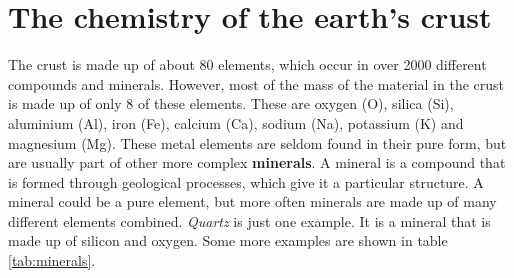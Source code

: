 
% 






\section{The chemistry of the earth's crust}

The crust is made up of about 80 elements, which occur in over 2000 different compounds and minerals. However, most of the mass of the material in the crust is made up of only 8 of these elements. These are oxygen (O), silica (Si), aluminium (Al), iron (Fe), calcium (Ca), sodium (Na), potassium (K) and magnesium (Mg). These metal elements are seldom found in their pure form, but are usually part of other more complex \textbf{minerals}. A mineral is a compound that is formed through geological processes, which give it a particular structure. A mineral could be a pure element, but more often minerals are made up of many different elements combined. \textit{Quartz} is just one example. It is a mineral that is made up of silicon and oxygen. Some more examples are shown in table \ref{tab:minerals}.

